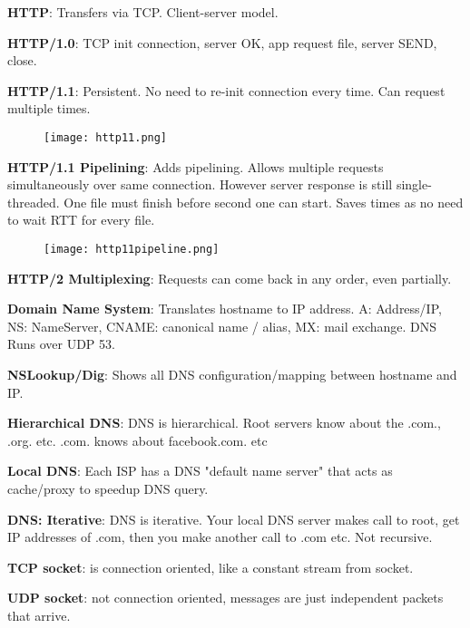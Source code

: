 \documentclass[a4paper,landscape]{article}
\newcommand{\rnname}[1]{\textbf{#1}}
\begin{document}
\begin{multicols*}{4}
\begin{flatitemize}
\item \rnname{HTTP}: Transfers via TCP. Client-server model.
\item \rnname{HTTP/1.0}: TCP init connection, server OK, app request file, server SEND, close.
\item \rnname{HTTP/1.1}: Persistent. No need to re-init connection every time. Can request multiple times.
\vspace{-1cm}
    \begin{figure}[H]
      \texttt{[image: http11.png]}
    \end{figure}
\vspace{-0.4cm}
\item \rnname{HTTP/1.1 Pipelining}: Adds pipelining. Allows multiple requests simultaneously over same connection. However server response is still single-threaded. One file must finish before second one can start. Saves times as no need to wait RTT for every file.
\vspace{-1cm}
    \begin{figure}[H]
      \texttt{[image: http11pipeline.png]}
    \end{figure}
\vspace{-0.4cm}
\item \rnname{HTTP/2 Multiplexing}: Requests can come back in any order, even partially.

\item \rnname{Domain Name System}: Translates hostname to IP address. A: Address/IP, NS: NameServer, CNAME: canonical name / alias, MX: mail exchange. DNS Runs over UDP 53.
\item \rnname{NSLookup/Dig}: Shows all DNS configuration/mapping between hostname and IP.
\item \rnname{Hierarchical DNS}: DNS is hierarchical. Root servers know about the .com., .org. etc. .com. knows about facebook.com. etc 
\item \rnname{Local DNS}: Each ISP has a DNS "default name server" that acts as cache/proxy to speedup DNS query.
\item \rnname{DNS: Iterative}: DNS is iterative. Your local DNS server makes call to root, get IP addresses of .com, then you make another call to .com etc. Not recursive.

\item \rnname{TCP socket}: is connection oriented, like a constant stream from socket.
\item \rnname{UDP socket}: not connection oriented, messages are just independent packets that arrive. 
\end{flatitemize}


\end{multicols*}
\end{document}

